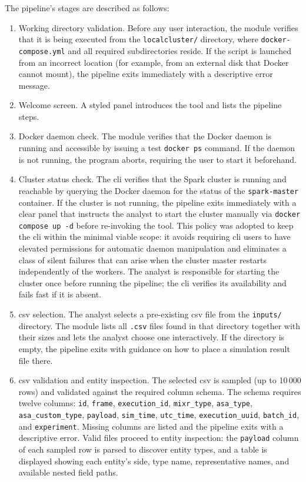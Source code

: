 The pipeline's stages are described as follows:

\begin{enumerate}

\item Working directory validation. Before any user interaction, the module verifies
that it is being executed from the \texttt{localcluster/} directory, where
\texttt{docker-compose.yml} and all required subdirectories reside. If the script is launched
from an incorrect location (for example, from an external disk that Docker cannot mount), the
pipeline exits immediately with a descriptive error message.

\item Welcome screen. A styled panel introduces the tool and lists the pipeline steps.

\item Docker daemon check. The module verifies that the Docker daemon is running and
accessible by issuing a test \texttt{docker ps} command. If the daemon is not running, the
program aborts, requiring the user to start it beforehand.

\item Cluster status check. The \gls{cli} verifies that the Spark cluster is running
and reachable by querying the Docker daemon for the status of the \texttt{spark-master} container.
If the cluster is not running, the pipeline exits immediately with a clear panel that instructs
the analyst to start the cluster manually via \texttt{docker compose up -d} before re-invoking
the tool. This policy was adopted to keep the \gls{cli} within the minimal viable scope: it avoids
requiring \gls{cli} users to have elevated permissions for automatic daemon manipulation and
eliminates a class of silent failures that can arise when the cluster master restarts
independently of the workers. The analyst is responsible for starting the cluster once before
running the pipeline; the \gls{cli} verifies its availability and fails fast if it is absent.

\item \gls{csv} selection. The analyst selects a pre-existing \gls{csv} file from the
\texttt{inputs/} directory. The module lists all \texttt{.csv} files found in that directory
together with their sizes and lets the analyst choose one interactively. If the directory is
empty, the pipeline exits with guidance on how to place a simulation result file there.

\item \gls{csv} validation and entity inspection. The selected \gls{csv} is sampled (up
to 10\,000 rows) and validated against the required column schema. The schema requires twelve
columns: \texttt{id}, \texttt{frame}, \texttt{execution\_id}, \texttt{mixr\_type},
\texttt{asa\_type}, \texttt{asa\_custom\_type}, \texttt{payload}, \texttt{sim\_time},
\texttt{utc\_time}, \texttt{execution\_uuid}, \texttt{batch\_id}, and \texttt{experiment}.
Missing columns are listed and the pipeline exits with a descriptive error. Valid files proceed
to entity inspection: the \texttt{payload} column of each sampled row is parsed to discover
entity types, and a table is displayed showing each entity's side, type name, representative
names, and available nested field paths.


\end{enumerate}
